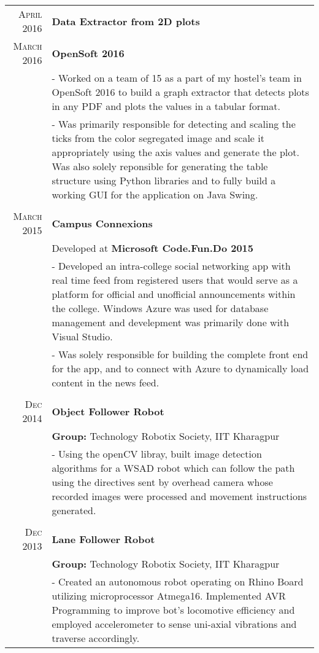 \documentclass[a4paper,10pt]{extarticle} %
\begin{document}
\begin{tabular}{r|p{16cm}}

\textsc{April 2016} & \textbf{Data Extractor from 2D plots} \\
\textsc{March 2016} & \textbf{OpenSoft 2016}\\
& \footnotesize{- Worked on a team of 15 as a part of my hostel's team in OpenSoft 2016 to build a graph extractor that detects plots in any PDF and plots the values in a tabular format.}\\
& \footnotesize{- Was primarily responsible for detecting and scaling the ticks from the color segregated image and scale it appropriately using the axis values and generate the plot. Was also solely reponsible for generating the table structure using Python libraries and to fully build a working GUI for the application on Java Swing.}\\
\multicolumn{2}{c}{} \\

\textsc{March 2015} & \textbf{Campus Connexions}\\
& Developed at \textbf{Microsoft Code.Fun.Do 2015}\\
& \footnotesize{- Developed an intra-college social networking app with real time feed from registered users that would serve as a platform for official and unofficial announcements within the college. Windows Azure was used for database management and develepment was primarily done with Visual Studio.}\\
& \footnotesize{- Was solely responsible for building the complete front end for the app, and to connect with Azure to dynamically load content in the news feed.}\\
\multicolumn{2}{c}{} \\

\textsc{Dec 2014} & \textbf{Object Follower Robot} \\
& \textbf{Group: }\textmd{Technology Robotix Society}, IIT Kharagpur\\
& \footnotesize{- Using the openCV libray, built image detection algorithms for a WSAD robot which can follow the path using the directives sent by overhead camera whose recorded images were processed and movement instructions generated.}\\
\multicolumn{2}{c}{} \\

\textsc{Dec 2013} & \textbf{Lane Follower Robot} \\
& \textbf{Group: }\textmd{Technology Robotix Society}, IIT Kharagpur\\
& \footnotesize{- Created an autonomous robot operating on Rhino Board utilizing microprocessor Atmega16. Implemented AVR Programming to improve bot's locomotive efficiency and employed accelerometer to sense uni-axial vibrations and traverse accordingly.}\\

\end{tabular}
\end{document}
